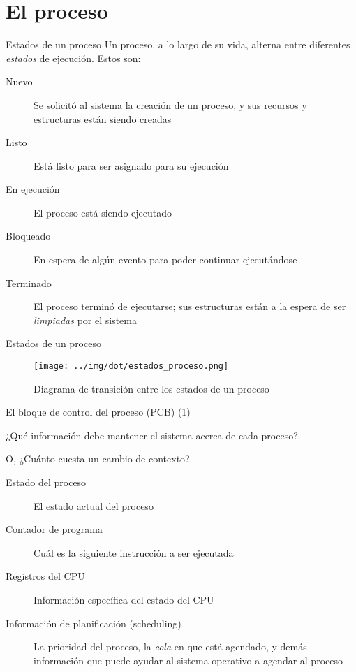 \documentclass[presentation]{beamer}
\begin{document}
\section{El proceso}
\label{sec:orgc3f2d36}

\begin{frame}[label={sec:orge00af58}]{Estados de un proceso}
Un proceso, a lo largo de su vida, alterna entre diferentes \emph{estados}
de ejecución. Estos son:

\begin{description}
\item[{Nuevo}] Se solicitó al sistema la creación de un proceso, y sus
recursos y estructuras están siendo creadas

\item[{Listo}] Está listo para ser asignado para su ejecución

\item[{En ejecución}] El proceso está siendo ejecutado

\item[{Bloqueado}] En espera de algún evento para poder continuar
ejecutándose

\item[{Terminado}] El proceso terminó de ejecutarse; sus estructuras están
a la espera de ser \emph{limpiadas} por el sistema
\end{description}
\end{frame}

\begin{frame}[label={sec:org899c864}]{Estados de un proceso}
\begin{figure}[htbp]
\centering
\texttt{[image: ../img/dot/estados\_proceso.png]}
\caption{Diagrama de transición entre los estados de un proceso}
\end{figure}
\end{frame}

\begin{frame}[label={sec:orgc48f019}]{El bloque de control del proceso (PCB) (1)}
\begin{center}
¿Qué información debe mantener el sistema acerca de cada proceso?

O, ¿Cuánto cuesta un cambio de contexto?
\end{center}

\begin{description}
\item[{Estado del proceso}] El estado actual del proceso

\item[{Contador de programa}] Cuál es la siguiente instrucción a ser
ejecutada

\item[{Registros del CPU}] Información específica del estado del CPU

\item[{Información de planificación (scheduling)}] La prioridad del
proceso, la \emph{cola} en que está agendado, y demás información que
puede ayudar al sistema operativo a agendar al proceso
\end{description}
\end{frame}
\end{document}

